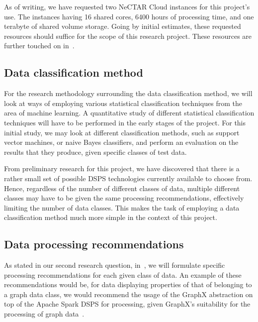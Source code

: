 \documentclass[a4paper,11pt]{article}
\begin{document}
As of writing, we have requested two NeCTAR Cloud instances for this project's use. The instances having 16 shared
cores, 6400 hours of processing time, and one terabyte of shared volume storage. Going by initial estimates, these
requested resources should suffice for the scope of this research project. These resources are further touched on
in~.


\subsection{Data classification method} %
\label{sub:data_classification_method}

For the research methodology surrounding the data classification method, we will look at ways of employing various
statistical classification techniques from the area of machine learning. A quantitative study of different statistical
classification techniques will have to be performed in the early stages of the project. For this initial study, we may
look at different classification methods, such as support vector machines, or naive Bayes classifiers, and perform an
evaluation on the results that they produce, given specific classes of test data.

From preliminary research for this project, we have discovered that there is a rather small set of possible DSPS
technologies currently available to choose from. Hence, regardless of the number of different classes of data, multiple
different classes may have to be given the same processing recommendations, effectively limiting the number of data
classes. This makes the task of employing a data classification method much more simple in the context of this project.


\subsection{Data processing recommendations} %
\label{sub:data_processing_recommendations}

As stated in our second research question, in~, we will formulate specific processing
recommendations for each given class of data. An example of these recommendations would be, for data displaying
properties of that of belonging to a graph data class, we would recommend the usage of the GraphX abstraction on top of
the Apache Spark DSPS for processing, given GraphX's suitability for the processing of graph
data~\cite{DBLP:journals/corr/XinCDGFS14}.
\end{document}

